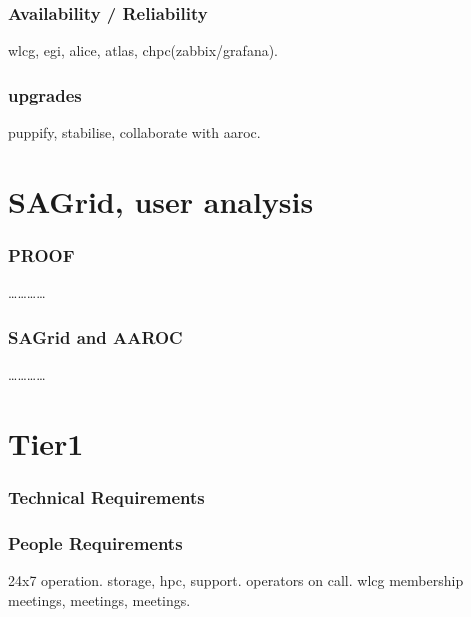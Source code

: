 \documentclass{beamer}
\begin{document}
\begin{frame}
  \frametitle{Availability / Reliability}
  wlcg, egi, alice, atlas, chpc(zabbix/grafana).
\end{frame}

\begin{frame}
  \frametitle{upgrades}
  puppify, stabilise, collaborate with aaroc.
\end{frame}

\section{SAGrid, user analysis}
\begin{frame}
\frametitle{PROOF}
\ldots\ldots\ldots\ldots
\end{frame}


\begin{frame}
\frametitle{SAGrid and AAROC}
\ldots\ldots\ldots\ldots
\end{frame}

\section{Tier1}

\begin{frame}
\frametitle{Technical Requirements} 

\end{frame}

\begin{frame}
\frametitle{People Requirements} 
24x7 operation.
storage, hpc, support.
operators on call.
wlcg membership
meetings, meetings, meetings.
\end{frame}
\end{document}
